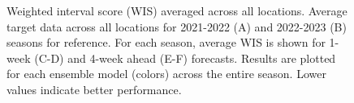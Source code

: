 \documentclass[
  article,
  shortnames,
  notitle]{jss}
\begin{document}
\begin{figure}


\caption{\label{fig-wis-vs-forecast-date}Weighted interval score (WIS)
averaged across all locations. Average target data across all locations
for 2021-2022 (A) and 2022-2023 (B) seasons for reference. For each
season, average WIS is shown for 1-week (C-D) and 4-week ahead (E-F)
forecasts. Results are plotted for each ensemble model (colors) across
the entire season. Lower values indicate better performance.}

\end{figure}%
\end{document}
